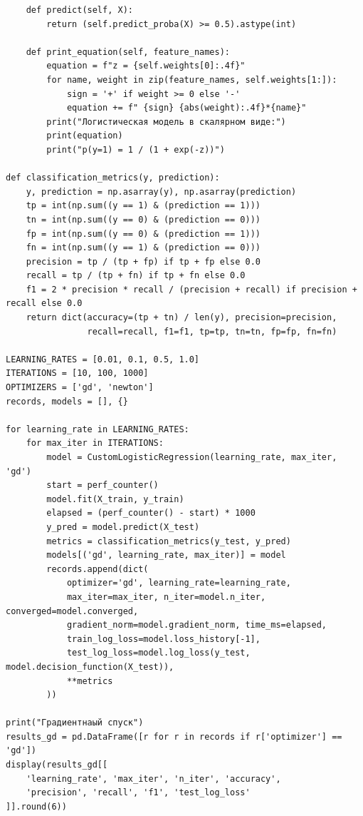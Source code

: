\documentclass[a4paper,12pt]{article}
\begin{document}
\begin{verbatim}
    def predict(self, X):
        return (self.predict_proba(X) >= 0.5).astype(int)

    def print_equation(self, feature_names):
        equation = f"z = {self.weights[0]:.4f}"
        for name, weight in zip(feature_names, self.weights[1:]):
            sign = '+' if weight >= 0 else '-'
            equation += f" {sign} {abs(weight):.4f}*{name}"
        print("Логистическая модель в скалярном виде:")
        print(equation)
        print("p(y=1) = 1 / (1 + exp(-z))")

def classification_metrics(y, prediction):
    y, prediction = np.asarray(y), np.asarray(prediction)
    tp = int(np.sum((y == 1) & (prediction == 1)))
    tn = int(np.sum((y == 0) & (prediction == 0)))
    fp = int(np.sum((y == 0) & (prediction == 1)))
    fn = int(np.sum((y == 1) & (prediction == 0)))
    precision = tp / (tp + fp) if tp + fp else 0.0
    recall = tp / (tp + fn) if tp + fn else 0.0
    f1 = 2 * precision * recall / (precision + recall) if precision + recall else 0.0
    return dict(accuracy=(tp + tn) / len(y), precision=precision,
                recall=recall, f1=f1, tp=tp, tn=tn, fp=fp, fn=fn)

LEARNING_RATES = [0.01, 0.1, 0.5, 1.0]
ITERATIONS = [10, 100, 1000]
OPTIMIZERS = ['gd', 'newton']
records, models = [], {}

for learning_rate in LEARNING_RATES:
    for max_iter in ITERATIONS:
        model = CustomLogisticRegression(learning_rate, max_iter, 'gd')
        start = perf_counter()
        model.fit(X_train, y_train)
        elapsed = (perf_counter() - start) * 1000
        y_pred = model.predict(X_test)
        metrics = classification_metrics(y_test, y_pred)
        models[('gd', learning_rate, max_iter)] = model
        records.append(dict(
            optimizer='gd', learning_rate=learning_rate,
            max_iter=max_iter, n_iter=model.n_iter, converged=model.converged,
            gradient_norm=model.gradient_norm, time_ms=elapsed,
            train_log_loss=model.loss_history[-1],
            test_log_loss=model.log_loss(y_test, model.decision_function(X_test)),
            **metrics
        ))

print("Градиентнаый спуск")
results_gd = pd.DataFrame([r for r in records if r['optimizer'] == 'gd'])
display(results_gd[[
    'learning_rate', 'max_iter', 'n_iter', 'accuracy',
    'precision', 'recall', 'f1', 'test_log_loss'
]].round(6))


\end{verbatim}
\end{document}
